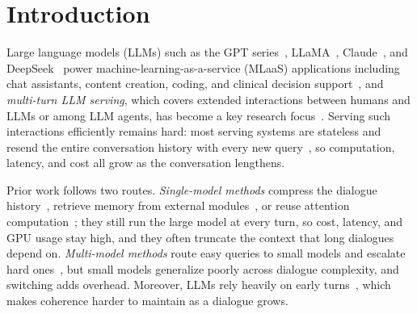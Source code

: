 \section{Introduction}\label{sec:intro} 







Large language models (LLMs) such as the GPT series~\citep{brown2020language, achiam2023gpt}, LLaMA~\citep{touvron2023llama2, grattafiori2024llama3}, Claude~\citep{anthropic_introducing_claude_2023}, and DeepSeek~\citep{guo2025deepseek} power machine-learning-as-a-service (MLaaS) applications including chat assistants, content creation, coding, and clinical decision support~\citep{park2023thinking, dong2023towards, zhao2025amplifying, liu2024exploring, li2026llmclinicalgraphstructure}, and \textit{multi-turn LLM serving}, which covers extended interactions between humans and LLMs or among LLM agents, has become a key research focus~\citep{yi2024survey, li2025beyond}. Serving such interactions efficiently remains hard: most serving systems are stateless and resend the entire conversation history with every new query~\citep{gao2024cost, jeong2025accelerating}, so computation, latency, and cost all grow as the conversation lengthens.

Prior work follows two routes. \textit{Single-model methods} compress the dialogue history~\citep{wang2025recursively, chen2024compress, xiao2024efficient}, retrieve memory from external modules~\citep{melz2023enhancing, gutierrez2024hipporag}, or reuse attention computation~\citep{gao2024cost, jeong2025accelerating, anthropic_prompt_caching_2024}; they still run the large model at every turn, so cost, latency, and GPU usage stay high, and they often truncate the context that long dialogues depend on. \textit{Multi-model methods} route easy queries to small models and escalate hard ones~\citep{behera2025towards, ding2024hybrid, shnitzer2023large, cheng2026latentrouter}, but small models generalize poorly across dialogue complexity, and switching adds overhead. Moreover, LLMs rely heavily on early turns~\citep{xiao2024efficient, laban2025llms}, which makes coherence harder to maintain as a dialogue grows. 

